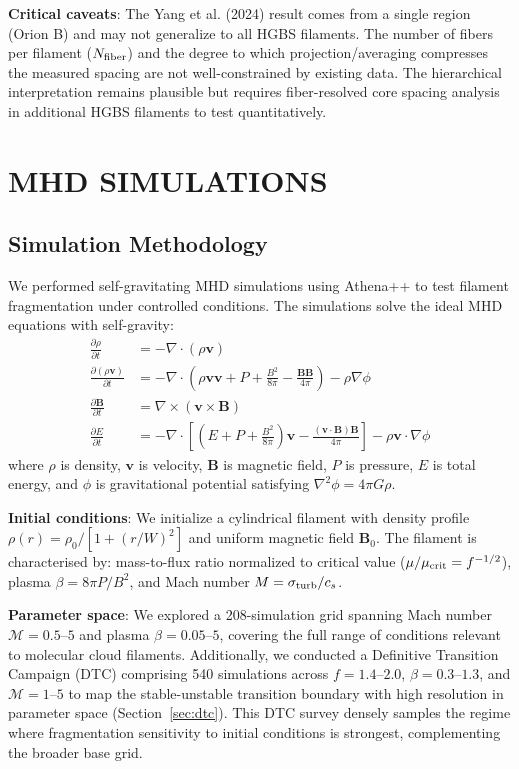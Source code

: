 \documentclass[twoside,twocolumn]{mnras}
\begin{document}
\textbf{Critical caveats}: The Yang et al. (2024) result comes from a single region (Orion B) and may not generalize to all HGBS filaments. The number of fibers per filament ($N_{\rm fiber}$) and the degree to which projection/averaging compresses the measured spacing are not well-constrained by existing data. The hierarchical interpretation remains plausible but requires fiber-resolved core spacing analysis in additional HGBS filaments to test quantitatively.

\section{MHD SIMULATIONS}

\subsection{Simulation Methodology}

We performed self-gravitating MHD simulations using Athena++ \citep{Stone2020} to test filament fragmentation under controlled conditions. The simulations solve the ideal MHD equations with self-gravity:
\begin{align}
\frac{\partial \rho}{\partial t} &= -\nabla \cdot (\rho \mathbf{v}) \\
\frac{\partial (\rho \mathbf{v})}{\partial t} &= -\nabla \cdot \left(\rho \mathbf{v} \mathbf{v} + P + \frac{B^2}{8\pi} - \frac{\mathbf{B}\mathbf{B}}{4\pi}\right) - \rho \nabla \phi \\
\frac{\partial \mathbf{B}}{\partial t} &= \nabla \times (\mathbf{v} \times \mathbf{B}) \\
\frac{\partial E}{\partial t} &= -\nabla \cdot \left[(E + P + \frac{B^2}{8\pi})\mathbf{v} - \frac{(\mathbf{v} \cdot \mathbf{B})\mathbf{B}}{4\pi}\right] - \rho \mathbf{v} \cdot \nabla \phi
\end{align}
where $\rho$ is density, $\mathbf{v}$ is velocity, $\mathbf{B}$ is magnetic field, $P$ is pressure, $E$ is total energy, and $\phi$ is gravitational potential satisfying $\nabla^2 \phi = 4\pi G\rho$.

\textbf{Initial conditions}: We initialize a cylindrical filament with density profile $\rho(r) = \rho_0 / [1 + (r/W)^2]$ and uniform magnetic field $\mathbf{B}_0$. The filament is characterised by: mass-to-flux ratio normalized to critical value ($\mu/\mu_{\rm crit} = f^{-1/2}$), plasma $\beta = 8\pi P/B^2$, and Mach number $M = \sigma_{\rm turb}/c_s$.

\textbf{Parameter space}: We explored a 208-simulation grid spanning Mach number $\mathcal{M} = 0.5$--$5$ and plasma $\beta = 0.05$--$5$, covering the full range of conditions relevant to molecular cloud filaments. Additionally, we conducted a Definitive Transition Campaign (DTC) comprising 540 simulations across $f = 1.4$--$2.0$, $\beta = 0.3$--$1.3$, and $\mathcal{M} = 1$--$5$ to map the stable-unstable transition boundary with high resolution in parameter space (Section~\ref{sec:dtc}). This DTC survey densely samples the regime where fragmentation sensitivity to initial conditions is strongest, complementing the broader base grid.
\end{document}
